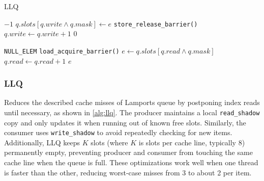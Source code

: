 \begin{algorithm}[!ht]
   \centering
   \captionsetup{justification=centering}
   \caption{\acl{LLQ} \cite{MaffioneCacheAware}}
   \label{alg:lamport-queue}
   \scriptsize
   \begin{algorithmic}[1]
            
               \State \Return $-1$ 
           \EndIf
           \State $q.slots[q.write \land q.mask] \gets e$
           \State \texttt{store\_release\_barrier()}
           \State $q.write \gets q.write + 1$
           \State \Return $0$
       \EndFunction
       
       \State
       
            
               \State \Return \texttt{NULL\_ELEM} 
           \EndIf
           \State \texttt{load\_acquire\_barrier()}
           \State $e \gets q.slots[q.read \land q.mask]$
           \State $q.read \gets q.read + 1$
           \State \Return $e$
       \EndFunction
   \end{algorithmic}
   \cite{MaffioneCacheAware}
\end{algorithm}

\subsubsection{\acl{LLQ}}
Reduces the described cache misses of Lamports queue by postponing index reads until necessary, as shown in \cref{alg:llq}. The producer maintains a local \texttt{read\_shadow} copy and only updates it when running out of known free slots. Similarly, the consumer uses \texttt{write\_shadow} to avoid repeatedly checking for new items. Additionally, \ac{LLQ} keeps $K$ slots (where $K$ is slots per cache line, typically 8) permanently empty, preventing producer and consumer from touching the same cache line when the queue is full. These optimizations work well when one thread is faster than the other, reducing worst-case misses from 3 to about 2 per item. \cite{MaffioneCacheAware}


